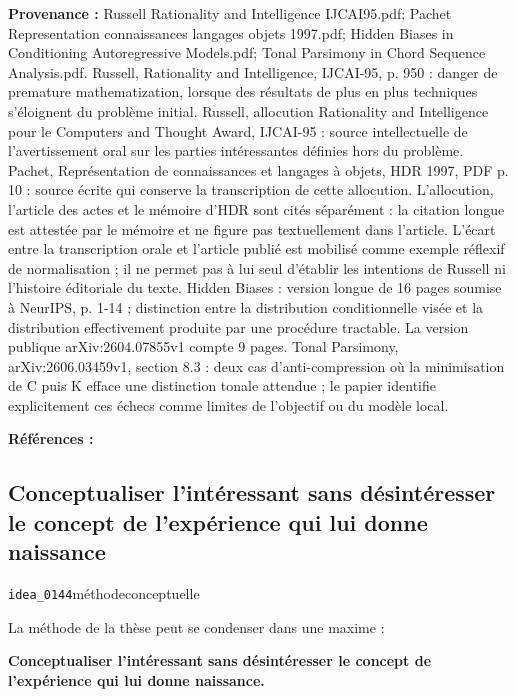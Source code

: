 \documentclass[10pt,a4paper]{article}
\begin{document}
{\footnotesize\color{metadata}\textbf{Provenance :} Russell Rationality and Intelligence IJCAI95.pdf; Pachet Representation connaissances langages objets 1997.pdf; Hidden Biases in Conditioning Autoregressive Models.pdf; Tonal Parsimony in Chord Sequence Analysis.pdf. Russell, Rationality and Intelligence, IJCAI-95, p. 950 : danger de premature mathematization, lorsque des résultats de plus en plus techniques s'éloignent du problème initial. Russell, allocution Rationality and Intelligence pour le Computers and Thought Award, IJCAI-95 : source intellectuelle de l'avertissement oral sur les parties intéressantes définies hors du problème. Pachet, Représentation de connaissances et langages à objets, HDR 1997, PDF p. 10 : source écrite qui conserve la transcription de cette allocution. L'allocution, l'article des actes et le mémoire d'HDR sont cités séparément : la citation longue est attestée par le mémoire et ne figure pas textuellement dans l'article. L'écart entre la transcription orale et l'article publié est mobilisé comme exemple réflexif de normalisation ; il ne permet pas à lui seul d'établir les intentions de Russell ni l'histoire éditoriale du texte. Hidden Biases : version longue de 16 pages soumise à NeurIPS, p. 1-14 ; distinction entre la distribution conditionnelle visée et la distribution effectivement produite par une procédure tractable. La version publique arXiv:2604.07855v1 compte 9 pages. Tonal Parsimony, arXiv:2606.03459v1, section 8.3 : deux cas d'anti-compression où la minimisation de C puis K efface une distinction tonale attendue ; le papier identifie explicitement ces échecs comme limites de l'objectif ou du modèle local.\par}
{\footnotesize\color{metadata}\textbf{Références :} \parencite{russell1995awardlecture,russell1995rationality,pachet1997representation,pachet2026biases,pachet2026tonalparsimony}\par}

\subsection{Conceptualiser l'intéressant sans désintéresser le concept de l'expérience qui lui donne naissance}
{\small\color{metadata} \texttt{idea\_0144}\quad\textbullet\quad méthode\quad\textbullet\quad conceptuelle\par}

La méthode de la thèse peut se condenser dans une maxime :

\textbf{Conceptualiser l'intéressant sans désintéresser le concept de l'expérience qui lui donne naissance.}
\end{document}
